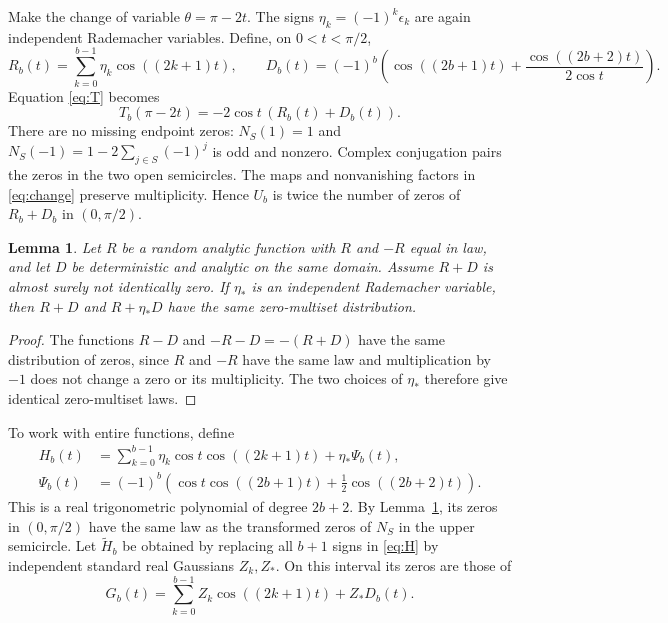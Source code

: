 \documentclass[11pt]{article}
\newtheorem{lemma}[theorem]{Lemma}
\begin{document}
Make the change of variable $\theta=\pi-2t$. The signs
$\eta_k=(-1)^k\epsilon_k$ are again independent Rademacher variables.
Define, on $0<t<\pi/2$,
\begin{equation}\label{eq:RD}
 R_b(t)=\sum_{k=0}^{b-1}\eta_k\cos((2k+1)t),\qquad
 D_b(t)=(-1)^b\left(\cos((2b+1)t)+\frac{\cos((2b+2)t)}{2\cos t}\right).
\end{equation}
Equation \eqref{eq:T} becomes
\begin{equation}\label{eq:change}
 T_b(\pi-2t)=-2\cos t\,(R_b(t)+D_b(t)).
\end{equation}
There are no missing endpoint zeros: $N_S(1)=1$ and
$N_S(-1)=1-2\sum_{j\in S}(-1)^j$ is odd and nonzero.
Complex conjugation pairs the zeros in the two open semicircles.
The maps and nonvanishing factors in \eqref{eq:change} preserve
multiplicity. Hence $U_b$ is twice the number of zeros of $R_b+D_b$
in $(0,\pi/2)$.

\begin{lemma}\label{lem:symmetrize}
Let $R$ be a random analytic function with $R$ and $-R$ equal in law,
and let $D$ be deterministic and analytic on the same domain.
Assume $R+D$ is almost surely not identically zero.
If $\eta_*$ is an independent Rademacher variable, then $R+D$ and
$R+\eta_*D$ have the same zero-multiset distribution.
\end{lemma}
\begin{proof}
The functions $R-D$ and $-R-D=-(R+D)$ have the same distribution of
zeros, since $R$ and $-R$ have the same law and multiplication by $-1$
does not change a zero or its multiplicity. The two choices of $\eta_*$
therefore give identical zero-multiset laws.
\end{proof}

To work with entire functions, define
\begin{equation}\label{eq:H}\begin{aligned}
 H_b(t)&=\sum_{k=0}^{b-1}\eta_k\cos t\cos((2k+1)t)
       +\eta_*\Psi_b(t),\\
 \Psi_b(t)&=(-1)^b\left(\cos t\cos((2b+1)t)
                    +\tfrac12\cos((2b+2)t)\right).
\end{aligned}\end{equation}
This is a real trigonometric polynomial of degree $2b+2$.
By Lemma~\ref{lem:symmetrize}, its zeros in $(0,\pi/2)$ have the same
law as the transformed zeros of $N_S$ in the upper semicircle.
Let $\widetilde H_b$ be obtained by replacing all $b+1$ signs in
\eqref{eq:H} by independent standard real Gaussians $Z_k,Z_*$.
On this interval its zeros are those of
\begin{equation}\label{eq:G}
 G_b(t)=\sum_{k=0}^{b-1}Z_k\cos((2k+1)t)+Z_*D_b(t).
\end{equation}
\end{document}
